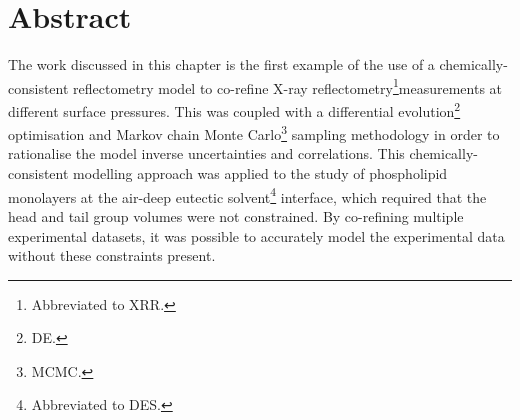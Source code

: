\section*{Abstract}
The work discussed in this chapter is the first example of the use of a chemically-consistent reflectometry model to co-refine X-ray reflectometry\footnote{Abbreviated to XRR.}measurements at different surface pressures.
This was coupled with a differential evolution\footnote{DE.} optimisation and Markov chain Monte Carlo\footnote{MCMC.} sampling methodology in order to rationalise the model inverse uncertainties and correlations.
This chemically-consistent modelling approach was applied to the study of phospholipid monolayers at the air-deep eutectic solvent\footnote{Abbreviated to DES.} interface, which required that the head and tail group volumes were not constrained.
By co-refining multiple experimental datasets, it was possible to accurately model the experimental data without these constraints present.
